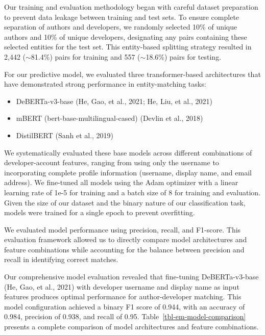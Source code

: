 \documentclass[
  letterpaper,
  DIV=11,
  numbers=noendperiod]{scrartcl}
\providecommand{\tightlist}{%
  \setlength{\itemsep}{0pt}\setlength{\parskip}{0pt}}
\begin{document}
Our training and evaluation methodology began with careful dataset
preparation to prevent data leakage between training and test sets. To
ensure complete separation of authors and developers, we randomly
selected 10\% of unique authors and 10\% of unique developers,
designating any pairs containing these selected entities for the test
set. This entity-based splitting strategy resulted in 2,442
($\sim$81.4\%) pairs for training and 557
($\sim$18.6\%) pairs for testing.

For our predictive model, we evaluated three transformer-based
architectures that have demonstrated strong performance in
entity-matching tasks:

\begin{itemize}
\tightlist
\item
  DeBERTa-v3-base (He, Gao, et al., 2021; He, Liu, et al., 2021)
\item
  mBERT (bert-base-multilingual-cased) (Devlin et al., 2018)
\item
  DistilBERT (Sanh et al., 2019)
\end{itemize}

We systematically evaluated these base models across different
combinations of developer-account features, ranging from using only the
username to incorporating complete profile information (username,
display name, and email address). We fine-tuned all models using the
Adam optimizer with a linear learning rate of 1e-5 for training and a
batch size of 8 for training and evaluation. Given the size of our
dataset and the binary nature of our classification task, models were
trained for a single epoch to prevent overfitting.

We evaluated model performance using precision, recall, and F1-score.
This evaluation framework allowed us to directly compare model
architectures and feature combinations while accounting for the balance
between precision and recall in identifying correct matches.

Our comprehensive model evaluation revealed that fine-tuning
DeBERTa-v3-base (He, Gao, et al., 2021) with developer username and
display name as input features produces optimal performance for
author-developer matching. This model configuration achieved a binary F1
score of 0.944, with an accuracy of 0.984, precision of 0.938, and
recall of 0.95. Table~\ref{tbl-em-model-comparison} presents a complete
comparison of model architectures and feature combinations.
\end{document}
